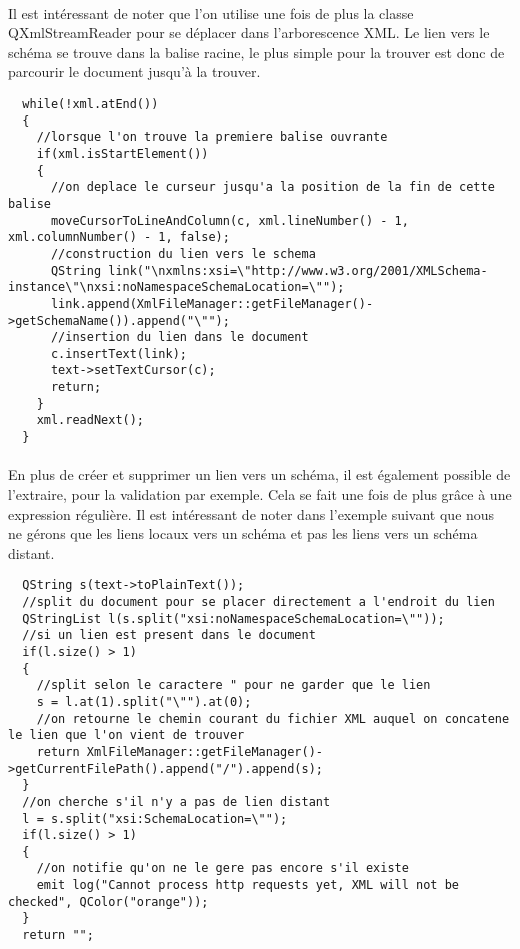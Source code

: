 \paragraph{}
Il est intéressant de noter que l'on utilise une fois de plus la classe QXmlStreamReader pour se déplacer dans l'arborescence XML. Le lien vers le schéma se trouve dans la balise racine, le plus simple pour la trouver est donc de parcourir le document jusqu'à la trouver.
\begin{lstlisting}
  while(!xml.atEnd())
  {
    //lorsque l'on trouve la premiere balise ouvrante
    if(xml.isStartElement())
    {
      //on deplace le curseur jusqu'a la position de la fin de cette balise
      moveCursorToLineAndColumn(c, xml.lineNumber() - 1, xml.columnNumber() - 1, false);
      //construction du lien vers le schema
      QString link("\nxmlns:xsi=\"http://www.w3.org/2001/XMLSchema-instance\"\nxsi:noNamespaceSchemaLocation=\"");
      link.append(XmlFileManager::getFileManager()->getSchemaName()).append("\"");
      //insertion du lien dans le document
      c.insertText(link);
      text->setTextCursor(c);
      return;
    }
    xml.readNext();
  }
\end{lstlisting}
\paragraph{}
En plus de créer et supprimer un lien vers un schéma, il est également possible de l'extraire, pour la validation par exemple. Cela se fait une fois de plus grâce à une expression régulière. Il est intéressant de noter dans l'exemple suivant que nous ne gérons que les liens locaux vers un schéma et pas les liens vers un schéma distant.
\begin{lstlisting}
  QString s(text->toPlainText());
  //split du document pour se placer directement a l'endroit du lien
  QStringList l(s.split("xsi:noNamespaceSchemaLocation=\""));
  //si un lien est present dans le document
  if(l.size() > 1)
  {
    //split selon le caractere " pour ne garder que le lien
    s = l.at(1).split("\"").at(0);
    //on retourne le chemin courant du fichier XML auquel on concatene le lien que l'on vient de trouver
    return XmlFileManager::getFileManager()->getCurrentFilePath().append("/").append(s);
  }
  //on cherche s'il n'y a pas de lien distant
  l = s.split("xsi:SchemaLocation=\"");
  if(l.size() > 1)
  {
    //on notifie qu'on ne le gere pas encore s'il existe
    emit log("Cannot process http requests yet, XML will not be checked", QColor("orange"));
  }
  return "";
\end{lstlisting}
